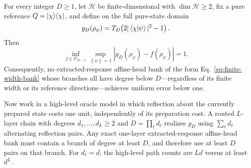 \documentclass[pdflatex,sn-mathphys,NameDate,iicol]{sn-jnl}
\newcommand{\norm}[1]{\left\lVert #1\right\rVert}
\newcommand{\proj}[1]{\ket{#1}\!\bra{#1}}
\newcommand{\cH}{\mathcal{H}}
\newcommand{\cV}{\mathcal{V}}
\begin{document}
\begin{proposition}
\label{prop:native-reflection-separation}
For every integer $D\ge1$, let $\cH$ be finite-dimensional with
$\dim\cH\ge2$, fix a pure reference $Q=\proj\chi$, and define on the full
pure-state domain
\begin{equation}
 g_D(\rho_\psi)
 =T_D\!\left(2|\braket{\chi | \psi}|^2-1\right).
 \label{eq:width-robust-target}
\end{equation}
Then
\begin{equation}
 \inf_{f\in\cV_{D-1}}
 \sup_{\norm\psi=1}
 |g_D(\rho_\psi)-f(\rho_\psi)|=1.
 \label{eq:width-robust-barrier}
\end{equation}
Consequently, no extracted-response affine-head bank of the form
Eq.~\eqref{eq:finite-width-bank} whose branches all have degree below
$D$---regardless of its finite width or its reference directions---achieves
uniform error below one.

Now work in a high-level oracle model in which reflection about the currently
prepared state costs one unit, independently of its preparation cost. A
routed $L$-layer chain with degrees $d_1,\ldots,d_L\ge2$ and
$D=\prod_\ell d_\ell$ realizes $g_D$ using
$\sum_\ell d_\ell$ alternating reflection pairs. Any exact one-layer
extracted-response affine-head bank must contain a branch of degree at least
$D$, and therefore use at least $D$ pairs on that branch. For $d_\ell=d$, the
high-level path counts are $Ld$ versus at least $d^L$.
\end{proposition}
\end{document}
